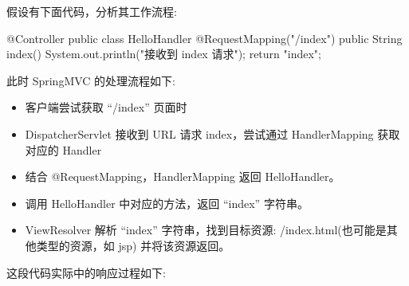 假设有下面代码，分析其工作流程:
\begin{Java}
@Controller
public class HelloHandler {
    @RequestMapping("/index")
    public String index() {
        System.out.println("接收到 index 请求");
        return "index";
    }
}
\end{Java}

此时 SpringMVC 的处理流程如下:

\begin{itemize}
    \item 客户端尝试获取 “/index” 页面时
    \item DispatcherServlet 接收到 URL 请求 index，尝试通过 HandlerMapping 获取对应的 Handler
    \item 结合 @RequestMapping，HandlerMapping 返回 HelloHandler。
    \item 调用 HelloHandler 中对应的方法，返回 ``index'' 字符串。
    \item ViewResolver 解析 ``index'' 字符串，找到目标资源: /index.html(也可能是其他类型的资源，如 jsp) 并将该资源返回。
\end{itemize}

这段代码实际中的响应过程如下:

